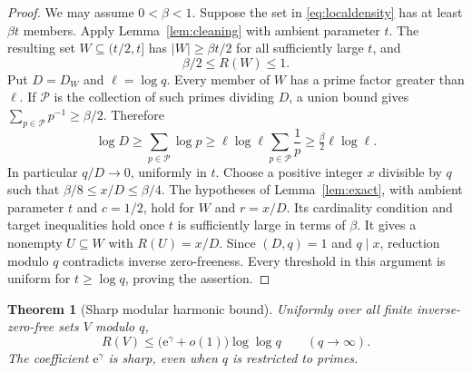 \documentclass[11pt,leqno]{amsart}
\numberwithin{equation}{section}
\newtheorem{theorem}{Theorem}[section]
\theoremstyle{definition}
\theoremstyle{remark}
\newcommand{\e}{\mathrm e}
\newcommand{\card}[1]{\lvert #1\rvert}
\begin{document}
\begin{proof}
We may assume $0<\beta<1$. Suppose the set in \eqref{eq:localdensity}
has at least $\beta t$ members. Apply Lemma~\ref{lem:cleaning} with
ambient parameter $t$. The resulting set $W\subseteq(t/2,t]$ has
$\card W\ge\beta t/2$ for all sufficiently large $t$, and
\[
 \beta/2\le R(W)\le1.
\]
Put $D=D_W$ and $\ell=\log q$. Every member of $W$ has a prime factor
greater than $\ell$. If $\mathcal P$ is the collection of such primes
dividing $D$, a union bound gives $\sum_{p\in\mathcal P}p^{-1}\ge\beta/2$.
Therefore
\begin{equation}\label{eq:largelcm}
 \log D\ge\sum_{p\in\mathcal P}\log p
 \ge\ell\log\ell\sum_{p\in\mathcal P}\frac1p
 \ge\tfrac\beta2\ell\log\ell.
\end{equation}
In particular $q/D\longrightarrow0$, uniformly in $t$.
Choose a positive integer $x$ divisible by $q$ such that
$\beta/8\le x/D\le\beta/4$. The hypotheses of
Lemma~\ref{lem:exact}, with ambient parameter $t$ and $c=1/2$, hold for
$W$ and $r=x/D$. Its cardinality condition and target inequalities hold
once $t$ is sufficiently large in terms of $\beta$.
It gives a nonempty $U\subseteq W$ with $R(U)=x/D$.
Since $(D,q)=1$ and $q\mid x$, reduction modulo $q$ contradicts inverse
zero-freeness. Every threshold in this argument is uniform for
$t\ge\log q$, proving the assertion.
\end{proof}

\begin{theorem}[Sharp modular harmonic bound]\label{thm:harmonic}
Uniformly over all finite inverse-zero-free sets $V$ modulo $q$,
\begin{equation}\label{eq:modularsharp}
 R(V)\le\bigl(\e^\gamma+o(1)\bigr)\log\log q
 \qquad(q\longrightarrow\infty).
\end{equation}
The coefficient $\e^\gamma$ is sharp, even when $q$ is restricted to primes.
\end{theorem}
\end{document}
